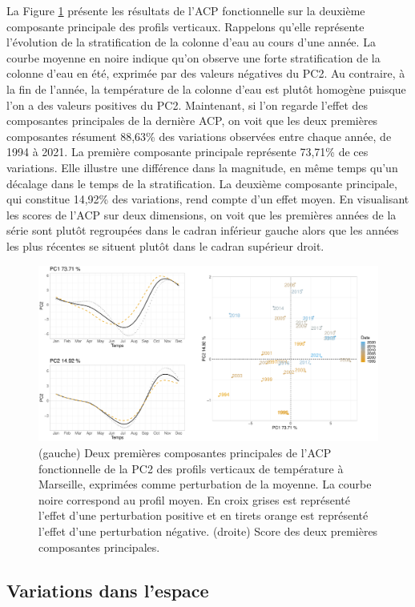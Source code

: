 \documentclass[12pt]{article}
\begin{document}
La Figure \ref{acp_pc} présente les résultats de l’ACP fonctionnelle sur la deuxième composante principale des profils verticaux. Rappelons qu’elle représente l’évolution de la stratification de la colonne d’eau au cours d’une année. La courbe moyenne en noire indique qu’on observe une forte stratification de la colonne d’eau en été, exprimée par des valeurs négatives du PC2.  Au contraire, à la fin de l’année, la température de la colonne d’eau est plutôt homogène puisque l'on a des valeurs positives du PC2. Maintenant, si l’on regarde l’effet des composantes principales de la dernière ACP, on voit que les deux premières composantes résument 88,63\% des variations observées entre chaque année, de 1994 à 2021. La première composante principale représente 73,71\% de ces variations. Elle illustre une différence dans la magnitude, en même temps qu’un décalage dans le temps de la stratification. La deuxième composante principale, qui constitue 14,92\% des variations, rend compte d’un effet moyen.  En visualisant les scores de l’ACP sur deux dimensions, on voit que les premières années de la série sont plutôt regroupées dans le cadran inférieur gauche alors que les années les plus récentes se situent plutôt dans le cadran supérieur droit. 

\begin{figure}
\centering
\includegraphics[width=.9\textwidth]{fig/R133_ACP_PC.pdf}
\caption{(gauche) Deux premières composantes principales de l'ACP fonctionnelle de la PC2 des profils verticaux de température à Marseille, exprimées comme perturbation de la moyenne. La courbe noire correspond au profil moyen. En croix grises est représenté l’effet d’une perturbation positive et en tirets orange est représenté l’effet d’une perturbation négative. (droite) Score des deux premières composantes principales.}
\label{acp_pc}
\end{figure}

\subsection{Variations dans l'espace}
\end{document}
